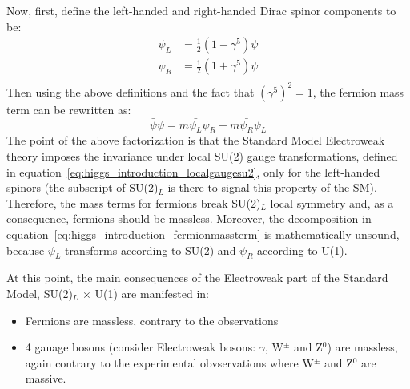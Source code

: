 Now, first, define the left-handed and right-handed Dirac spinor components to be:
\begin{subequations}\label{eq:higgs_introduction_chiralprojections}
\begin{align}
    \psi_L& = \frac{1}{2}(1 - \gamma^{5})\psi\\
    \psi_R& = \frac{1}{2}(1 + \gamma^{5})\psi\\
\end{align}
\end{subequations}
Then using the above definitions and the fact that $(\gamma^5)^2 = 1$, the fermion mass term can be rewritten as:
\begin{equation}\label{eq:higgs_introduction_fermionmassterm}
    \bar{\psi}\psi = m \bar{\psi_L}\psi_R + m \bar{\psi_R}\psi_L
\end{equation}
The point of the above factorization is that the Standard Model Electroweak theory imposes the invariance under local SU(2) gauge transformations, defined in equation~\ref{eq:higgs_introduction_localgaugesu2}, only for the left-handed spinors (the subscript of SU(2)$_L$ is there to signal this property of the SM). Therefore, the mass terms for fermions break SU(2)$_L$ local symmetry and, as a consequence, fermions should be massless. Moreover, the decomposition in equation~\ref{eq:higgs_introduction_fermionmassterm} is mathematically unsound, because $\psi_L$ transforms according to SU(2) and $\psi_R$ according to U(1).

At this point, the main consequences of the Electroweak part of the Standard Model, SU(2)$_L$ $\times$ U(1) are manifested in:
\begin{itemize}
    \item Fermions are massless, contrary to the observations
    \item 4 gauage bosons (consider Electroweak bosons: $\gamma$, W$^{\pm}$ and Z$^0$) are massless, again contrary to the experimental obvservations where W$^{\pm}$ and Z$^0$ are massive.
\end{itemize}

